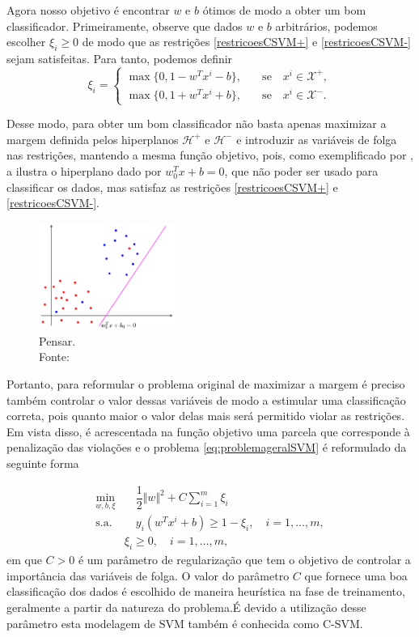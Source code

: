 \documentclass[12pt,a4paper]{scrartcl}
\def\Xset{\mathcal{X}}
\def\Hset{\mathcal{H}}
\theoremstyle{definition}%
\begin{document}
Agora nosso objetivo é encontrar $w$ e $b$ ótimos de modo a obter um bom classificador. Primeiramente, observe que dados $w$ e $b$ arbitrários, podemos escolher $\xi_{i} \geq 0$ de modo que as restrições \eqref{restricoesCSVM+} e \eqref{restricoesCSVM-} sejam satisfeitas. Para tanto, podemos definir
\[
\xi_{i} =  \left \{ \begin{array}{cc} \max\{0, 1-w^{T}x^{i}-b\}, & \quad \text{se} \quad x^{i} \in \Xset^{+}, \\
\max\{0, 1+w^{T}x^{i}+b\}, & \quad \text{se} \quad x^{i} \in \Xset^{-}.
\end{array} \right .
\]
 
Desse modo, para obter um bom classificador não basta apenas maximizar a margem definida pelos hiperplanos $\Hset^{+}$ e $\Hset^{-}$ e introduzir as variáveis de folga nas restrições, mantendo a mesma função objetivo, pois, como exemplificado por \textcite{Evelin2017}, a  ilustra o hiperplano dado por $w_{0}^{T}x+b = 0$, que não poder ser usado para classificar os dados, mas satisfaz as restrições \eqref{restricoesCSVM+} e \eqref{restricoesCSVM-}. 

\begin{figure}[!h] 
	\centering
	\includegraphics[width=0.40\textwidth]{restricoes_maximizacaomargem}
	\caption{Pensar. \label{fig6} \\ Fonte: \textcite{Evelin2017}}
\end{figure}
 

Portanto, para reformular o problema original de maximizar a margem é preciso também controlar o valor dessas variáveis de modo a estimular uma classificação correta, pois quanto maior o valor delas mais será permitido violar as restrições. Em vista disso, é acrescentada na função objetivo uma parcela que corresponde à penalização das violações e o problema \eqref{eq:problemageralSVM} é reformulado da seguinte forma

\[ \label{eq:problemaCSVM}
\begin{aligned}
\min_{w,b,\xi} & \quad \dfrac{1}{2} \Vert w\Vert^{2} + C \sum_{i=1}^{m} \xi_{i} \\
\text{s.a.} &  \quad y_i(w^{T}x^{i}+b) \geq 1 - \xi_{i}, \quad i=1, \ldots , m, \\
& \xi_{i} \geq 0, \quad i=1, \ldots , m,\end{aligned}
\]
em que $C>0$ é um parâmetro de regularização que tem o objetivo de controlar a importância das variáveis de folga. O valor do parâmetro $C$ que fornece uma boa classificação dos dados é escolhido de maneira heurística na fase de treinamento, geralmente a partir da natureza do problema.É devido a utilização desse parâmetro esta modelagem de SVM também é conhecida como C-SVM.
\end{document}
